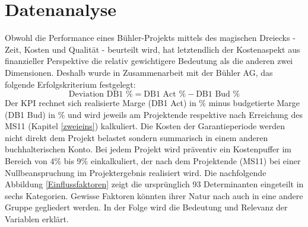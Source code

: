 \section{Datenanalyse}\label{sec:dataana}
Obwohl die Performance eines Bühler-Projekts mittels des magischen Dreiecks - Zeit, Kosten und Qualität - beurteilt wird, hat letztendlich der Kostenaspekt aus finanzieller Perspektive die relativ gewichtigere Bedeutung als die anderen zwei Dimensionen. Deshalb wurde in Zusammenarbeit mit der Bühler AG, das folgende Erfolgskriterium festgelegt:
\begin{equation}
\text{Deviation DB1 \%} = \text{DB1 Act \%} - \text{DB1 Bud \%}
\end{equation}
Der KPI rechnet sich realisierte Marge (DB1 Act) in \% minus budgetierte Marge (DB1 Bud) in \% und wird jeweils am Projektende respektive nach Erreichung des MS11 (Kapitel \ref{zweieins}) kalkuliert. Die Kosten der Garantieperiode werden nicht direkt dem Projekt belastet sondern summarisch in einem anderen buchhalterischen Konto. Bei jedem Projekt wird präventiv ein Kostenpuffer im Bereich von 4\% bis 9\% einkalkuliert, der nach dem Projektende (MS11) bei einer Nullbeanspruchung im Projektergebnis realisiert wird.
\newline Die nachfolgende Abbildung \ref{Einflussfaktoren} zeigt die ursprünglich 93 Determinanten eingeteilt in sechs Kategorien. Gewisse Faktoren könnten ihrer Natur nach auch in eine andere Gruppe gegliedert werden. In der Folge wird die Bedeutung und Relevanz der Variablen erklärt.

\newpage



